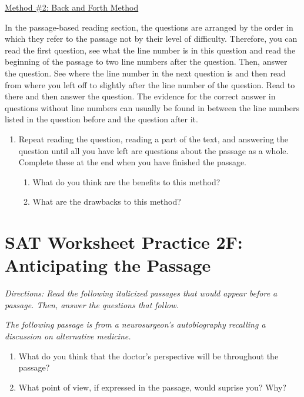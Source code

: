 \vfill
\underline{Method \#2: Back and Forth Method}

In the passage-based reading section, the questions are arranged by the order in which they refer to the passage not by their level of difficulty. Therefore, you can read the first question, see what the line number is in this question and read the beginning of the passage to two line numbers after the question. Then, answer the question. See where the line number in the next question is and then read from where you left off to slightly after the line number of the question. Read to there and then answer the question. The evidence for the correct answer in questions without line numbers can usually be found in between the line numbers listed in the question before and the question after it. 

\begin{enumerate}
\item Repeat reading the question, reading a part of the text, and answering the question until all you have left are questions about the passage as a whole. Complete these at the end when you have finished the passage. 

\vfill
\begin{enumerate}
\item What do you think are the benefits to this method?
\vfill\item What are the drawbacks to this method?
\end{enumerate}
\end{enumerate}

\vfill
\newpage

\section[Anticipating the Passage]{SAT Worksheet Practice 2F: Anticipating the Passage}
\textit{Directions: Read the following italicized passages that would appear before a passage. Then, answer the questions that follow.}

\bigskip
\textit{The following passage is from a neurosurgeon's autobiography recalling a discussion on alternative medicine.}\\
\begin{enumerate}
\item What do you think that the doctor's perspective will be throughout the passage? \hrulefill  \\
\item What point of view, if expressed in the passage, would suprise you? Why? \hrulefill \\
\end{enumerate}

